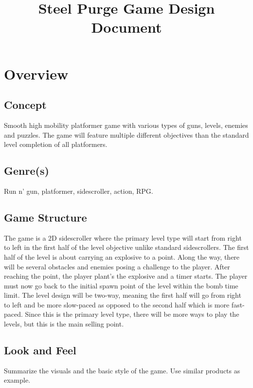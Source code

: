 \documentclass[12pt]{article}
\title{Steel Purge Game Design Document}
\begin{document}
\maketitle{}

\section{Overview}


\subsection{Concept}

Smooth high mobility platformer game with various types of guns, levels, enemies and puzzles. The game will feature multiple different objectives than the standard level completion of all platformers. 

\subsection{Genre(s)}

Run n' gun, platformer, sidescroller, action, RPG.

\subsection{Game Structure}

The game is a 2D sidescroller where the primary level type will start from right to left in the first half of the level objective unlike standard sidescrollers. The first half of the level is about carrying an explosive to a point. Along the way, there will be several obstacles and enemies posing a challenge to the player. After reaching the point, the player plant's the explosive and a timer starts. The player must now go back to the initial spawn point of the level within the bomb time limit. The level design will be two-way, meaning the first half will go from right to left and be more slow-paced as opposed to the second half which is more fast-paced. Since this is the primary level type, there will be more ways to play the levels, but this is the main selling point. 

\subsection{Look and Feel}

Summarize the visuals and the basic style of the game. Use similar products as example. 
\end{document}
